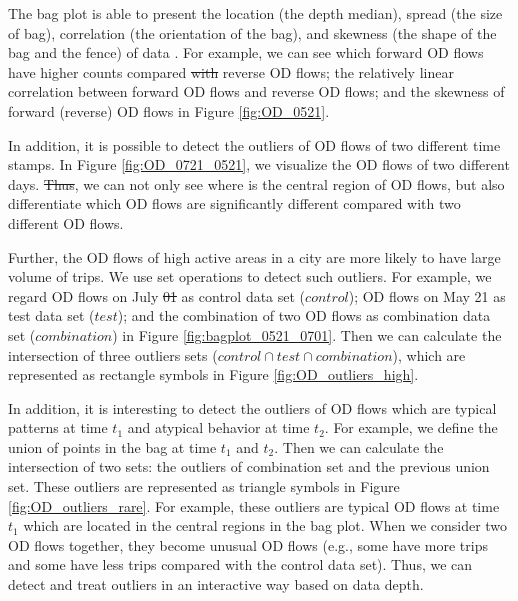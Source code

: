\documentclass[a4paper,UKenglish]{lipics-v2016}
\providecommand{\DIFadd}[1]{{\protect\color{blue}\uwave{#1}}} %
\providecommand{\DIFdel}[1]{{\protect\color{red}\sout{#1}}}                      %
\providecommand{\DIFaddbegin}{} %
\providecommand{\DIFaddend}{} %
\providecommand{\DIFdelbegin}{} %
\providecommand{\DIFdelend}{} %
\begin{document}
The bag plot is able to present the location (the depth median), spread (the size of bag), correlation (the orientation of the bag), and skewness (the shape of the bag and the fence) of data \cite{rousseeuw99AS}. For example, we can see which forward OD flows have higher counts compared \DIFdelbegin \DIFdel{with }\DIFdelend \DIFaddbegin \DIFadd{to the }\DIFaddend reverse OD flows; the relatively linear correlation between forward OD flows and reverse OD flows; and the skewness of forward (reverse) OD flows in Figure \ref{fig:OD_0521}. 

In addition, it is possible to detect the outliers of OD flows of two different time stamps. In Figure \ref{fig:OD_0721_0521}, we visualize the OD flows of two different days. \DIFdelbegin \DIFdel{Thus}\DIFdelend \DIFaddbegin \DIFadd{Therefore}\DIFaddend , we can not only see where is the central region of OD flows, but also differentiate which OD flows are significantly different compared with two different OD flows.

Further, the OD flows of high active areas in a city are more likely to have large volume of trips.
We use set operations to detect such outliers. For example, we regard OD flows on July \DIFdelbegin \DIFdel{01  }\DIFdelend \DIFaddbegin \DIFadd{1  }\DIFaddend as control data set ($control$); OD flows on May 21 as test data set ($test$); and the combination of two OD flows as combination data set ($combination$) in Figure \ref{fig:bagplot_0521_0701}. Then we can calculate the intersection of three outliers sets ($control \cap test \cap combination$), which are represented as rectangle symbols in Figure \ref{fig:OD_outliers_high}. 

In addition, it is interesting to detect the outliers of OD flows which are typical patterns at time $t_1$ and atypical behavior at time $t_2$.  For example, we define the union of points in the bag at time $t_1$ and $t_2$. Then we can calculate the intersection of two sets: the outliers of combination set and the previous union set. These outliers are represented as triangle symbols in Figure \ref{fig:OD_outliers_rare}. For example, these outliers are typical OD flows at time $t_1$ which are located in the central regions in the bag plot. When we consider two OD flows together, they become unusual OD flows (e.g., some have more trips and some have less trips compared with the control data set). Thus, we can detect and treat outliers in an interactive way based on data depth.

\end{document}
